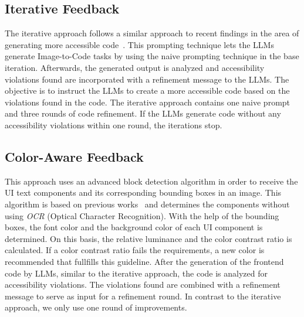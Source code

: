\subsection{Iterative Feedback}
The iterative approach follows a similar approach to recent findings in the area
of generating more accessible code~\parencite{suh2025accessiblecode}. This 
prompting technique lets the LLMs generate Image-to-Code tasks by using the naive 
prompting technique in the base iteration. Afterwards, the generated output is 
analyzed and accessibility violations found are incorporated with a refinement 
message to the LLMs. The objective is to instruct the LLMs to create a more 
accessible code based on the violations found in the code. The iterative approach 
contains one naive prompt and three rounds of code refinement. If the LLMs 
generate code without any accessibility violations within one round, the 
iterations stop.

\subsection{Color-Aware Feedback}
This approach uses an advanced block detection algorithm in order to receive
the UI text components and its corresponding bounding boxes in an image. This 
algorithm is based on previous works~\parencite{si2024design2code} and 
determines the components without using \textit{OCR} (Optical Character 
Recognition). With the help of the bounding boxes, the font color 
and the background color of each UI component is determined. On this basis,
the relative luminance and the color contrast ratio is calculated. If a 
color contrast ratio fails the requirements, a new color is recommended 
that fullfills this guideline.\newline
After the generation of the frontend code by LLMs, similar to the 
iterative approach, the code is analyzed for accessibility violations. The 
violations found are combined with a refinement message to serve as input 
for a refinement round. In contrast to the iterative approach, we only use 
one round of improvements.

